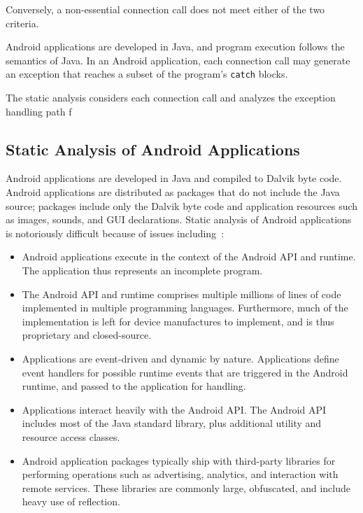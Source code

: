 \noindent Conversely, a non-essential connection call does not meet
either of the two criteria.  

Android applications are developed in Java, and program execution
follows the semantics of Java. In an Android application, each
connection call may generate an exception that reaches a subset of the
program's \lstinline!catch! blocks.  

The static analysis considers each connection call and analyzes the
exception handling path f




\subsection{Static Analysis of Android Applications}

Android applications are developed in Java and compiled to Dalvik byte
code.  Android applications are distributed as packages that do not
include the Java source; packages include only the Dalvik byte code
and application resources such as images, sounds, and GUI
declarations.  Static analysis of Android applications is notoriously
difficult because of issues including~\cite{Gordon:Kim:Perkins:Gilham:Nguyen:Rinard:NDSS15}: 

\begin{itemize}

\item Android applications execute in the context of the Android API
  and runtime.  The application thus represents an incomplete program.
  
\item The Android API and runtime comprises multiple millions of lines of
  code implemented in multiple programming languages.  Furthermore,
  much of the implementation is left for device manufactures to
  implement, and is thus proprietary and closed-source. 

\item Applications are event-driven and dynamic by nature.
  Applications define event handlers for possible runtime events that
  are triggered in the Android runtime, and passed to the application
  for handling. 

\item Applications interact heavily with the Android API.  The Android
  API includes most of the Java standard library, plus additional
  utility and resource access classes.

\item Android application packages typically ship with third-party
  libraries for performing operations such as advertising, analytics,
  and interaction with remote services.  These libraries are commonly
  large, obfuscated, and include heavy use of reflection.

\end{itemize}

